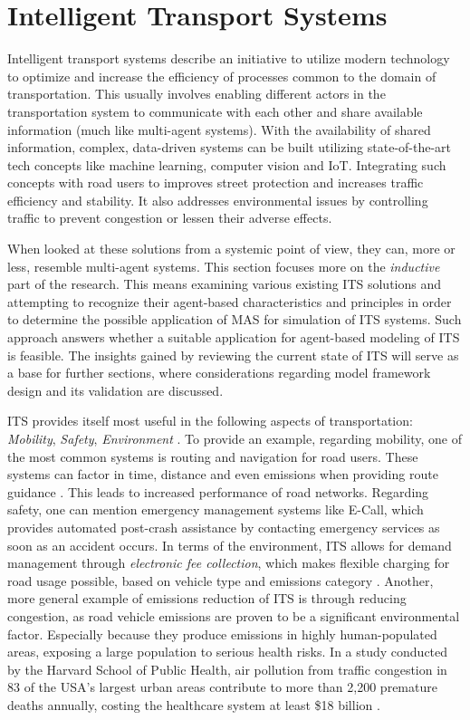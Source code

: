 \documentclass[0main.tex]{subfiles}
\begin{document}
\section{Intelligent Transport Systems}\label{sec-its}

Intelligent transport systems describe an initiative to utilize modern technology 
to optimize and increase the efficiency of processes common to the domain of transportation. 
This usually involves enabling different actors in the transportation system to communicate 
with each other and share available information (much like multi-agent systems). With the 
availability of shared information, complex, data-driven systems can be built utilizing 
state-of-the-art tech concepts like machine learning, computer vision and IoT. Integrating 
such concepts with road users to improves street protection and increases traffic efficiency and stability.
It also addresses environmental issues by controlling traffic to prevent congestion or lessen
their adverse effects. 

When looked at these solutions from a systemic point of view, they can, more or less,
resemble multi-agent systems. This section focuses more on the \emph{inductive} part of
the research. This means examining various existing ITS solutions and attempting to recognize their
agent-based characteristics and principles in order to determine the possible application of MAS for
simulation of ITS systems. Such approach answers whether a suitable application for agent-based modeling of ITS is
feasible. The insights gained by reviewing the current state of ITS will serve as a base for
further sections, where considerations regarding model framework design and its validation are
discussed. 

ITS provides itself most useful in the following aspects of transportation: 
\emph{Mobility}, \emph{Safety}, \emph{Environment} \cite{Lishchenko2021}. To provide an example, regarding mobility, 
one of the most common systems is routing and navigation for road users. These systems can 
factor in time, distance and even emissions when providing route guidance \cite{Firmin2006}. This leads to 
increased performance of road networks. Regarding safety, one can mention emergency management
systems like E-Call, which provides automated post-crash assistance by contacting emergency
services as soon as an accident occurs. In terms of the environment, 
ITS allows for demand management through \emph{electronic fee collection}, which makes flexible 
charging for road usage possible, based on vehicle type and emissions category \cite{Commision2022}.
Another, more general example of emissions reduction of ITS is through reducing congestion, as road vehicle 
emissions are proven to be a significant environmental factor. Especially because they produce emissions 
in highly human-populated areas, exposing a large population to serious health risks. In a study conducted by the Harvard
School of Public Health, air pollution from traffic congestion in 83 of the USA's largest urban
areas contribute to more than 2,200 premature deaths annually, costing the healthcare system at
least \$18 billion \cite{Levy2011}.
\end{document}
